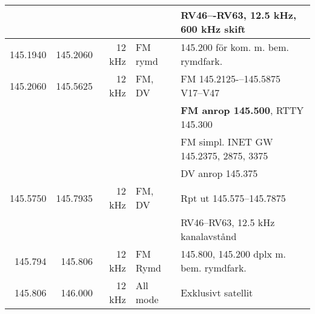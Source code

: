 \documentclass[10pt,swedish,a4paper]{article}
\begin{document}
\begin{landscape}
\begin{tabular}{rrrll}
	                  &           &                 &                 & RV46–-RV63, 12.5 kHz, 600 kHz skift     \\ \hline
	         145.1940 &  145.2060 &          12 kHz & FM rymd         & 145.200 för kom. m. bem. rymdfark.      \\ \hline
	         145.2060 &  145.5625 &          12 kHz & FM, DV          & FM 145.2125-–145.5875  V17–V47          \\
	                  &           &                 &                 & \textbf{FM anrop 145.500}, RTTY 145.300 \\
	                  &           &                 &                 & FM simpl. INET GW 145.2375, 2875, 3375  \\
	                  &           &                 &                 & DV anrop 145.375                        \\ \hline
	         145.5750 &  145.7935 &          12 kHz & FM, DV          & Rpt ut 145.575--145.7875                \\
	                  &           &                 &                 & RV46–RV63, 12.5 kHz kanalavstånd        \\ \hline
	          145.794 &   145.806 &          12 kHz & FM Rymd         & 145.800, 145.200 dplx m. bem. rymdfark. \\ \hline
	          145.806 &   146.000 &          12 kHz & All mode        & Exklusivt satellit                      \\ \hline
\end{tabular}
\end{landscape}
\end{document}
